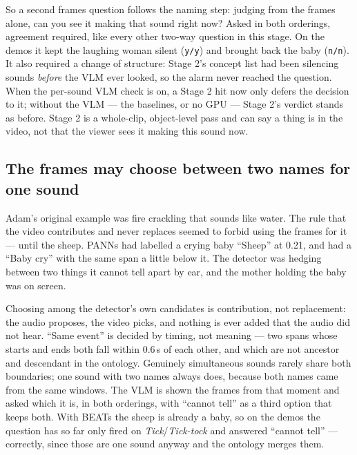\documentclass[11pt,a4paper]{article}
\begin{document}
So a second frames question follows the naming step: judging from the frames alone, can
you see it making that sound right now? Asked in both orderings, agreement required, like
every other two-way question in this stage. On the demos it kept the laughing woman silent
(\texttt{y/y}) and brought back the baby (\texttt{n/n}). It also required a change of
structure: Stage 2's concept list had been silencing sounds \emph{before} the VLM ever
looked, so the alarm never reached the question. When the per-sound VLM check is on, a
Stage 2 hit now only defers the decision to it; without the VLM --- the baselines, or no
GPU --- Stage 2's verdict stands as before. Stage 2 is a whole-clip, object-level pass and
can say a thing is in the video, not that the viewer sees it making this sound now.

\subsection{The frames may choose between two names for one sound}\label{sec:disamb}
Adam's original example was fire crackling that sounds like water. The rule that the
video contributes and never replaces seemed to forbid using the frames for it --- until
the sheep. PANNs had labelled a crying baby ``Sheep'' at 0.21, and had a ``Baby cry'' with
the same span a little below it. The detector was hedging between two things it cannot
tell apart by ear, and the mother holding the baby was on screen.

Choosing among the detector's own candidates is contribution, not replacement: the audio
proposes, the video picks, and nothing is ever added that the audio did not hear. ``Same
event'' is decided by timing, not meaning --- two spans whose starts and ends both fall
within 0.6\,s of each other, and which are not ancestor and descendant in the ontology.
Genuinely simultaneous sounds rarely share both boundaries; one sound with two names
always does, because both names came from the same windows. The VLM is shown the frames
from that moment and asked which it is, in both orderings, with ``cannot tell'' as a third
option that keeps both. With BEATs the sheep is already a baby, so on the demos the
question has so far only fired on \emph{Tick}/\emph{Tick-tock} and answered ``cannot
tell'' --- correctly, since those are one sound anyway and the ontology merges them.
\end{document}
